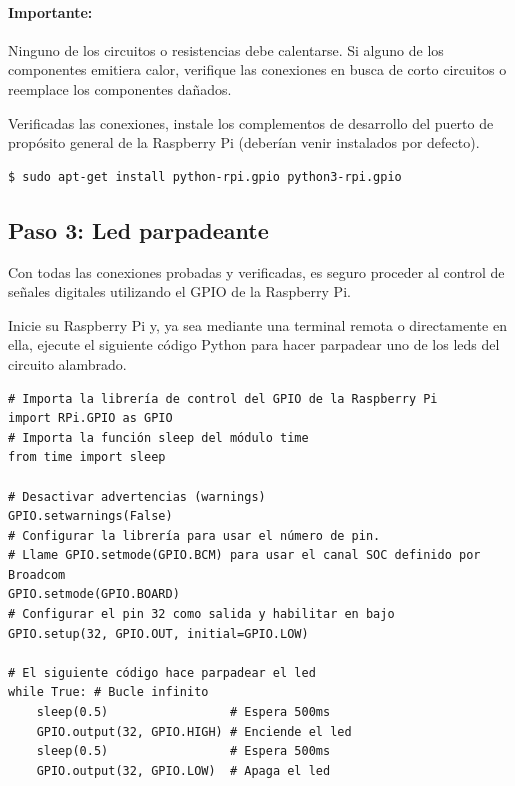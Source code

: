 \documentclass[letterpaper,10.5pt]{article}
\begin{document}
\paragraph{Importante:} Ninguno de los circuitos o resistencias debe calentarse.
Si alguno de los componentes emitiera calor, verifique las conexiones en busca de corto circuitos o reemplace los componentes dañados.

Verificadas las conexiones, instale los complementos de desarrollo del puerto de propósito general de la Raspberry Pi (deberían venir instalados por defecto).

\begin{Verbatim}[fontsize=\footnotesize]
$ sudo apt-get install python-rpi.gpio python3-rpi.gpio
\end{Verbatim}

%
%
\subsection{Paso 3: Led parpadeante}%
\label{sec:step3}
Con todas las conexiones probadas y verificadas, es seguro proceder al control de señales digitales utilizando el GPIO de la Raspberry Pi.

Inicie su Raspberry Pi y, ya sea mediante una terminal remota o directamente en ella, ejecute el siguiente código Python para hacer parpadear uno de los leds del circuito alambrado.

\medskip
\begin{lstlisting}
# Importa la librería de control del GPIO de la Raspberry Pi
import RPi.GPIO as GPIO
# Importa la función sleep del módulo time
from time import sleep

# Desactivar advertencias (warnings)
GPIO.setwarnings(False)
# Configurar la librería para usar el número de pin.
# Llame GPIO.setmode(GPIO.BCM) para usar el canal SOC definido por Broadcom
GPIO.setmode(GPIO.BOARD)
# Configurar el pin 32 como salida y habilitar en bajo
GPIO.setup(32, GPIO.OUT, initial=GPIO.LOW)

# El siguiente código hace parpadear el led
while True: # Bucle infinito
	sleep(0.5)                 # Espera 500ms
	GPIO.output(32, GPIO.HIGH) # Enciende el led
	sleep(0.5)                 # Espera 500ms
	GPIO.output(32, GPIO.LOW)  # Apaga el led
\end{lstlisting}
\medskip


%
%
\end{document}
